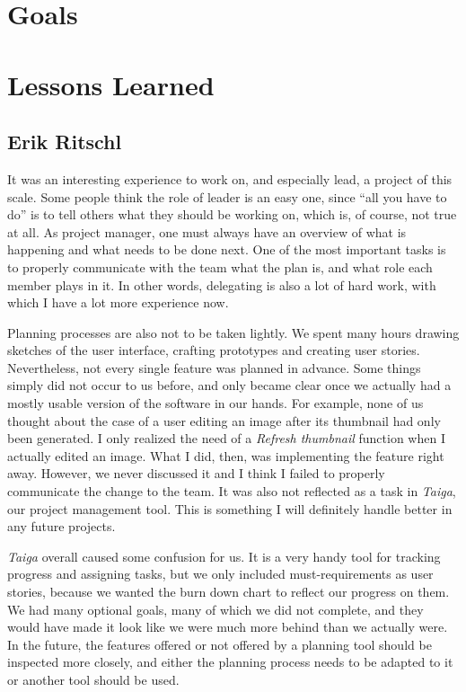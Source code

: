 \section{Goals}

\section{Lessons Learned}
\def\kapitelautor{}

\subsection{Erik Ritschl}
It was an interesting experience to work on, and especially lead, a project of this scale. Some people think the role of leader is an easy one, since ``all you have to do'' is to tell others what they should be working on, which is, of course, not true at all. As project manager, one must always have an overview of what is happening and what needs to be done next. One of the most important tasks is to properly communicate with the team what the plan is, and what role each member plays in it. In other words, delegating is also a lot of hard work, with which I have a lot more experience now.

Planning processes are also not to be taken lightly. We spent many hours drawing sketches of the user interface, crafting prototypes and creating user stories. 
Nevertheless, not every single feature was planned in advance. Some things simply did not occur to us before, and only became clear once we actually had a mostly usable version of the software in our hands. For example, none of us thought about the case of a user editing an image after its thumbnail had only been generated. I only realized the need of a \emph{Refresh thumbnail} function when I actually edited an image. What I did, then, was implementing the feature right away. However, we never discussed it and I think I failed to properly communicate the change to the team. It was also not reflected as a task in \emph{Taiga}, our project management tool. This is something I will definitely handle better in any future projects.

\emph{Taiga} overall caused some confusion for us. It is a very handy tool for tracking progress and assigning tasks, but we only included must-requirements as user stories, because we wanted the burn down chart to reflect our progress on them. We had many optional goals, many of which we did not complete, and they would have made it look like we were much more behind than we actually were. In the future, the features offered or not offered by a planning tool should be inspected more closely, and either the planning process needs to be adapted to it or another tool should be used.

